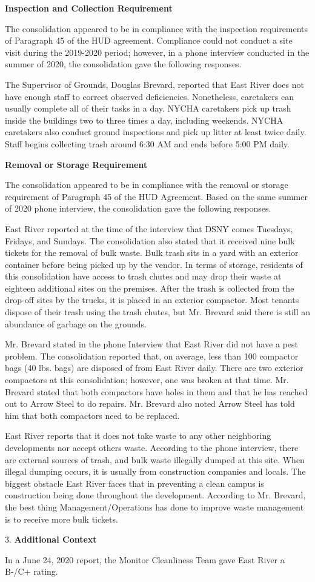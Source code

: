 

\textbf{Inspection and Collection Requirement}

The consolidation appeared to be in compliance with the inspection requirements of Paragraph 45 of the HUD agreement. Compliance could not conduct a site visit during the 2019-2020 period; however, in a phone interview conducted in the summer of 2020, the consolidation gave the following responses.

The Supervisor of Grounds, Douglas Brevard, reported that East River does not have enough staff to correct observed deficiencies. Nonetheless, caretakers can usually complete all of their tasks in a day. NYCHA caretakers pick up trash inside the buildings two to three times a day, including weekends. NYCHA caretakers also conduct ground inspections and pick up litter at least twice daily. Staff begins collecting trash around 6:30 AM and ends before 5:00 PM daily.

\textbf{Removal or Storage Requirement}

The consolidation appeared to be in compliance with the removal or storage requirement of Paragraph  45 of the HUD Agreement. Based on the same summer of  2020 phone interview, the consolidation gave the following responses.

East River reported at the time of the interview that DSNY comes Tuesdays, Fridays, and Sundays. The consolidation also stated that it received nine bulk tickets for the removal of bulk waste. Bulk trash sits in a yard with an exterior container before being picked up by the vendor. In terms of storage, residents of this consolidation have access to trash chutes and may drop their waste at eighteen additional sites on the premises. After the trash is collected from the drop-off sites by the trucks, it is placed in an exterior compactor. Most tenants dispose of their trash using the trash chutes, but Mr. Brevard said there is still an abundance of garbage on the grounds. 

Mr. Brevard stated in the phone Interview that East River did not have a pest problem. The consolidation reported that, on average, less than 100 compactor bags (40 lbs. bags) are disposed of from East River daily. There are two exterior compactors at this consolidation; however, one was broken at that time.  Mr. Brevard stated that both compactors have holes in them and that he has reached out to Arrow Steel to do repairs. Mr. Brevard also noted Arrow Steel has told him that both compactors need to be replaced. 

East River reports that it does not take waste to any other neighboring developments nor accept others waste. According to the phone interview, there are external sources of trash, and bulk waste illegally dumped at this site. When illegal dumping occurs, it is usually from construction companies and locals. The biggest obstacle East River faces that in preventing a clean campus is construction being done throughout the development. According to Mr. Brevard, the best thing Management/Operations has done to improve waste management is to receive more bulk tickets.  

3. \textbf{Additional Context}

In a June 24, 2020 report, the Monitor Cleanliness Team gave East River a B-/C+ rating. 